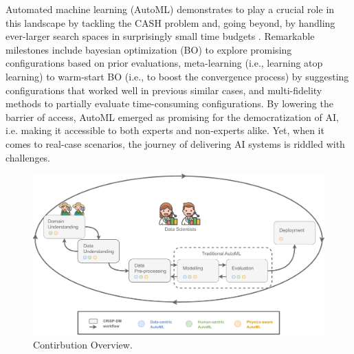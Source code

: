 Automated machine learning (AutoML) demonstrates to play a crucial role in this landscape by tackling the CASH problem and, going beyond, by handling ever-larger search spaces in surprisingly small time budgets \cite{small_time_budgets}.
Remarkable milestones include bayesian optimization (BO) to explore promising configurations based on prior evaluations,
meta-learning (i.e., learning atop learning) to warm-start BO (i.e., to boost the convergence process) by suggesting configurations that worked well in previous similar cases, and multi-fidelity methods to partially evaluate time-consuming configurations.
By lowering the barrier of access, AutoML emerged as promising for the democratization of AI, i.e. making it accessible to both experts and non-experts alike.
Yet, when it comes to real-case scenarios, the journey of
delivering AI systems is riddled with challenges.

\begin{figure}
    \centering
    \includegraphics[scale=0.35]{chapters/introduction/img/contribution_overview.pdf}
    \caption{Contirbution Overview.}
    \label{fig:contribution}
\end{figure}

